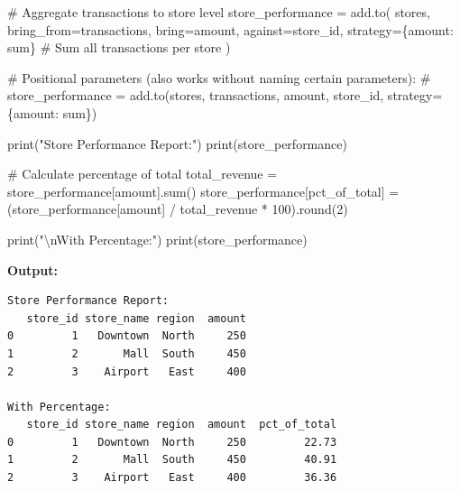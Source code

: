 \documentclass[
  letterpaper,
]{scrbook}
\newenvironment{Shaded}{\begin{snugshade}}{\end{snugshade}}
\newcommand{\BuiltInTok}[1]{\textcolor[rgb]{0.00,0.23,0.31}{#1}}
\newcommand{\CharTok}[1]{\textcolor[rgb]{0.13,0.47,0.30}{#1}}
\newcommand{\CommentTok}[1]{\textcolor[rgb]{0.37,0.37,0.37}{#1}}
\newcommand{\DecValTok}[1]{\textcolor[rgb]{0.68,0.00,0.00}{#1}}
\newcommand{\NormalTok}[1]{\textcolor[rgb]{0.00,0.23,0.31}{#1}}
\newcommand{\OperatorTok}[1]{\textcolor[rgb]{0.37,0.37,0.37}{#1}}
\newcommand{\StringTok}[1]{\textcolor[rgb]{0.13,0.47,0.30}{#1}}
\begin{document}
\begin{Shaded}
\begin{Highlighting}[]
\CommentTok{\# Aggregate transactions to store level}
\NormalTok{store\_performance }\OperatorTok{=}\NormalTok{ add.to(}
\NormalTok{    stores,}
\NormalTok{    bring\_from}\OperatorTok{=}\NormalTok{transactions,}
\NormalTok{    bring}\OperatorTok{=}\StringTok{\textquotesingle{}amount\textquotesingle{}}\NormalTok{,}
\NormalTok{    against}\OperatorTok{=}\StringTok{\textquotesingle{}store\_id\textquotesingle{}}\NormalTok{,}
\NormalTok{    strategy}\OperatorTok{=}\NormalTok{\{}\StringTok{\textquotesingle{}amount\textquotesingle{}}\NormalTok{: }\StringTok{\textquotesingle{}sum\textquotesingle{}}\NormalTok{\}  }\CommentTok{\# Sum all transactions per store}
\NormalTok{)}

\CommentTok{\# Positional parameters (also works without naming certain parameters):}
\CommentTok{\# store\_performance = add.to(stores, transactions, \textquotesingle{}amount\textquotesingle{}, \textquotesingle{}store\_id\textquotesingle{}, strategy=\{\textquotesingle{}amount\textquotesingle{}: \textquotesingle{}sum\textquotesingle{}\})}

\BuiltInTok{print}\NormalTok{(}\StringTok{"Store Performance Report:"}\NormalTok{)}
\BuiltInTok{print}\NormalTok{(store\_performance)}

\CommentTok{\# Calculate percentage of total}
\NormalTok{total\_revenue }\OperatorTok{=}\NormalTok{ store\_performance[}\StringTok{\textquotesingle{}amount\textquotesingle{}}\NormalTok{].}\BuiltInTok{sum}\NormalTok{()}
\NormalTok{store\_performance[}\StringTok{\textquotesingle{}pct\_of\_total\textquotesingle{}}\NormalTok{] }\OperatorTok{=}\NormalTok{ (store\_performance[}\StringTok{\textquotesingle{}amount\textquotesingle{}}\NormalTok{] }\OperatorTok{/}\NormalTok{ total\_revenue }\OperatorTok{*} \DecValTok{100}\NormalTok{).}\BuiltInTok{round}\NormalTok{(}\DecValTok{2}\NormalTok{)}

\BuiltInTok{print}\NormalTok{(}\StringTok{"}\CharTok{\textbackslash{}n}\StringTok{With Percentage:"}\NormalTok{)}
\BuiltInTok{print}\NormalTok{(store\_performance)}
\end{Highlighting}
\end{Shaded}

\textbf{Output:}

\begin{verbatim}
Store Performance Report:
   store_id store_name region  amount
0         1   Downtown  North     250
1         2       Mall  South     450
2         3    Airport   East     400

With Percentage:
   store_id store_name region  amount  pct_of_total
0         1   Downtown  North     250         22.73
1         2       Mall  South     450         40.91
2         3    Airport   East     400         36.36
\end{verbatim}
\end{document}
